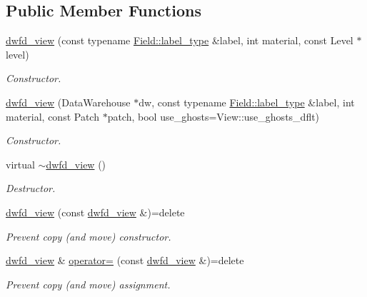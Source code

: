 \subsection*{Public Member Functions}
\begin{DoxyCompactItemize}
\item 
\hyperlink{classUintah_1_1PhaseField_1_1detail_1_1dwfd__view_3_01VectorField_3_01T_00_01N_01_4_00_01STN_00_01VAR_01_4_a33c0620dcc95371fc3e259301b0f8c96}{dwfd\+\_\+view} (const typename \hyperlink{structUintah_1_1PhaseField_1_1VectorField_a59698346336d8cdfdf767367839f2be9}{Field\+::label\+\_\+type} \&label, int material, const Level $\ast$level)
\begin{DoxyCompactList}\small\item\em Constructor. \end{DoxyCompactList}\item 
\hyperlink{classUintah_1_1PhaseField_1_1detail_1_1dwfd__view_3_01VectorField_3_01T_00_01N_01_4_00_01STN_00_01VAR_01_4_ab25c9dcbfd9066dc7a0167b873c81262}{dwfd\+\_\+view} (Data\+Warehouse $\ast$dw, const typename \hyperlink{structUintah_1_1PhaseField_1_1VectorField_a59698346336d8cdfdf767367839f2be9}{Field\+::label\+\_\+type} \&label, int material, const Patch $\ast$patch, bool use\+\_\+ghosts=View\+::use\+\_\+ghosts\+\_\+dflt)
\begin{DoxyCompactList}\small\item\em Constructor. \end{DoxyCompactList}\item 
virtual \hyperlink{classUintah_1_1PhaseField_1_1detail_1_1dwfd__view_3_01VectorField_3_01T_00_01N_01_4_00_01STN_00_01VAR_01_4_ac9d741b2ecbec42c72a35b5746f7355f}{$\sim$dwfd\+\_\+view} ()
\begin{DoxyCompactList}\small\item\em Destructor. \end{DoxyCompactList}\item 
\hyperlink{classUintah_1_1PhaseField_1_1detail_1_1dwfd__view_3_01VectorField_3_01T_00_01N_01_4_00_01STN_00_01VAR_01_4_a987a8d08b1d1bc84b76f7cdcff6df8c8}{dwfd\+\_\+view} (const \hyperlink{classUintah_1_1PhaseField_1_1detail_1_1dwfd__view}{dwfd\+\_\+view} \&)=delete
\begin{DoxyCompactList}\small\item\em Prevent copy (and move) constructor. \end{DoxyCompactList}\item 
\hyperlink{classUintah_1_1PhaseField_1_1detail_1_1dwfd__view}{dwfd\+\_\+view} \& \hyperlink{classUintah_1_1PhaseField_1_1detail_1_1dwfd__view_3_01VectorField_3_01T_00_01N_01_4_00_01STN_00_01VAR_01_4_a4086c5b46c3afc1ca97347100cad40b5}{operator=} (const \hyperlink{classUintah_1_1PhaseField_1_1detail_1_1dwfd__view}{dwfd\+\_\+view} \&)=delete
\begin{DoxyCompactList}\small\item\em Prevent copy (and move) assignment. \end{DoxyCompactList}\end{DoxyCompactItemize}
